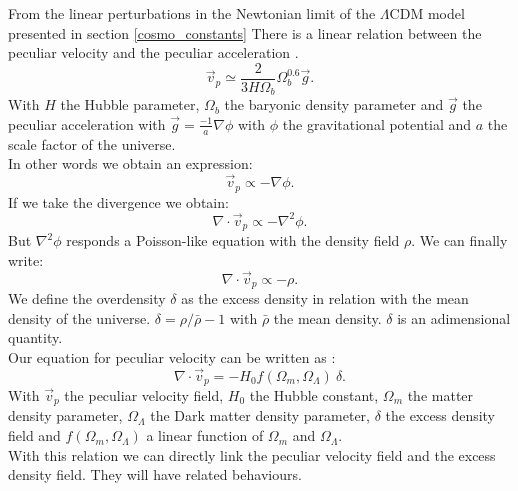 \documentclass[12pt]{article}
\begin{document}
\begin{par}
From the linear perturbations in the Newtonian limit of
 the $\Lambda$CDM model presented in section
  \ref{cosmo_constants} There is a linear relation
   between the peculiar velocity and the peculiar
    acceleration \cite{padmanabhan_theoretical_2000}.
\[
\vec{v}_p \simeq \frac{2}{3 H \Omega_b} \Omega_{b}^{0.6} \vec{g} .
\]
With $H$ the Hubble parameter,
 $\Omega_b$ the baryonic density parameter and $\vec{g}$ the
  peculiar acceleration with $\vec{g} = \frac{-1}{a}
   \nabla \phi $ with $\phi$ the gravitational
    potential and $a$ the scale factor of the universe.\\
In other words we obtain an expression:
\[ 
\vec{v}_p \propto  - \nabla \phi .
\]
If we take the divergence we obtain:
\[
\nabla \cdot \vec{v}_p \propto - \nabla^2 \phi .
\]
But $\nabla^2 \phi$ responds a Poisson-like equation
 with the density field $\rho$. We can finally write:
\[
\nabla \cdot \vec{v}_p \propto - \rho .
\]
We define the overdensity $\delta$ as the excess density
 in relation with the mean density of the universe.
 $\delta = \rho / \bar{\rho} -1$ with $\bar{\rho}$ the
  mean density. $\delta$ is an adimensional quantity. \\

Our equation for peculiar velocity can be written as
 \cite{tully_laniakea_2014}: 
\[
\nabla \cdot \vec{v}_p = - H_0 f(\Omega_m, \Omega_{\Lambda})\ \delta .
\] 
With $\vec{v}_p$ the peculiar velocity field, $H_0$ the
 Hubble constant, $\Omega_m$ the matter density
  parameter, $\Omega_{\Lambda}$ the Dark matter density
   parameter, $\delta$ the excess density field and $f(\Omega_m, \Omega_{\Lambda})$ a linear function of $\Omega_m$ and $\Omega_{\Lambda}$.\\
   With this relation we can directly link the peculiar
    velocity field and the excess density field. They
     will have related behaviours.
\end{par}
\end{document}
